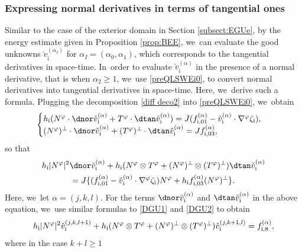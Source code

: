 \subsubsection{Expressing normal derivatives in terms of tangential ones}
Similar to the case of the exterior domain in Section \ref{subsect:EGUe}, by the energy estimate given in Proposition \ref{prop:BEE}, we~can evaluate the good unknowns $\check{v}_\mathrm{i}^{(\alpha_I)}$ for $\alpha_I=(\alpha_0,\alpha_1)$,
which corresponds to the tangential derivatives in space-time. In~order to evaluate $\check{v}_\mathrm{i}^{(\alpha)}$ in the presence of a normal derivative, that is when $\alpha_2\geq 1$, we~use \eqref{preQLSWEi0},
to convert normal derivatives into tangential derivatives in space-time.
Here, we~derive such a formula.
Plugging the decomposition \eqref{diff deco2} into \eqref{preQLSWEi0}, we~obtain
\[
\begin{cases}
h_\mathrm{i}(N^\varphi\cdot\dnor\check{v}_\mathrm{i}^{(\alpha)} + T^\varphi\cdot\dtan\check{v}_\mathrm{i}^{(\alpha)})
= J(f_{{\rm i}, 01}^{(\alpha)} - \check{v}_\mathrm{i}^{(\alpha)}\cdot\nabla^\varphi\zeta_\mathrm{i}), \\
(N^\varphi)^\perp\cdot\dnor\check{v}_\mathrm{i}^{(\alpha)} + (T^\varphi)^\perp\cdot\dtan\check{v}_\mathrm{i}^{(\alpha)} = Jf_{{\rm i},03}^{(\alpha)},
\end{cases}
\]
so that
\begin{multline*}
h_\mathrm{i}|N^\varphi|^2\dnor\check{v}_\mathrm{i}^{(\alpha)}
+ h_\mathrm{i}(N^\varphi\otimes T^\varphi + (N^\varphi)^\perp\otimes(T^\varphi)^\perp)\dtan\check{v}_\mathrm{i}^{(\alpha)} \\
= J\{ (f_{{\rm i}, 01}^{(\alpha)} - \check{v}_\mathrm{i}^{(\alpha)}\cdot\nabla^\varphi\zeta_\mathrm{i})N^\varphi
+ h_\mathrm{i }f_{{\rm i},03}^{(\alpha)}(N^\varphi)^\perp \}.
\end{multline*}%
\Changel%
Here, we~let $\alpha=(j,k,l)$.
For the terms $\dnor\check{v}_\mathrm{i}^{(\alpha)}$ and $\dtan\check{v}_\mathrm{i}^{(\alpha)}$ in the above equation, we~use similar formulas to \eqref{DGU1} and \eqref{DGU2} to obtain
\begin{equation}\label{QLSWEi2}
h_\mathrm{i}|N^\varphi|^2\check{v}_\mathrm{i}^{(j,k,l+1)}
+ h_\mathrm{i}(N^\varphi\otimes T^\varphi + (N^\varphi)^\perp\otimes(T^\varphi)^\perp)\check{v}_\mathrm{i}^{(j,k+1,l)} = f_{{\rm i},8}^{(\alpha)},
\end{equation}
where in the case $k+l\geq1$
